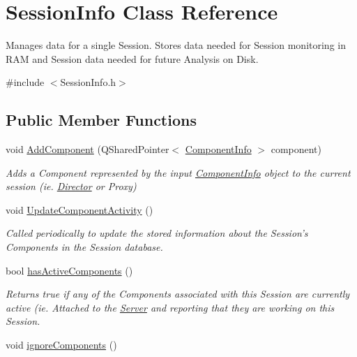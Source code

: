 \hypertarget{class_session_info}{\section{Session\-Info Class Reference}
\label{class_session_info}
}


Manages data for a single Session. Stores data needed for Session monitoring in R\-A\-M and Session data needed for future Analysis on Disk.  




{\ttfamily \#include $<$Session\-Info.\-h$>$}

\subsection*{Public Member Functions}
\begin{DoxyCompactItemize}
\item 
\hypertarget{class_session_info_a61e0959a79e819267bf4814f519ef99a}{void \hyperlink{class_session_info_a61e0959a79e819267bf4814f519ef99a}{Add\-Component} (Q\-Shared\-Pointer$<$ \hyperlink{class_component_info}{Component\-Info} $>$ component)}\label{class_session_info_a61e0959a79e819267bf4814f519ef99a}

\begin{DoxyCompactList}\small\item\em Adds a Component represented by the input \hyperlink{class_component_info}{Component\-Info} object to the current session (ie. \hyperlink{class_director}{Director} or Proxy) \end{DoxyCompactList}\item 
void \hyperlink{class_session_info_acc27036c722407afba5bf30965084fbb}{Update\-Component\-Activity} ()
\begin{DoxyCompactList}\small\item\em Called periodically to update the stored information about the Session's Components in the Session database. \end{DoxyCompactList}\item 
bool \hyperlink{class_session_info_acbb6ba7d4746d4cfe80777acd5f97997}{has\-Active\-Components} ()
\begin{DoxyCompactList}\small\item\em Returns true if any of the Components associated with this Session are currently active (ie. Attached to the \hyperlink{class_server}{Server} and reporting that they are working on this Session. \end{DoxyCompactList}\item 
\hypertarget{class_session_info_a7a6a1c43babe1d1771e76123c24f0933}{void \hyperlink{class_session_info_a7a6a1c43babe1d1771e76123c24f0933}{ignore\-Components} ()}\label{class_session_info_a7a6a1c43babe1d1771e76123c24f0933}


\end{DoxyCompactItemize}
